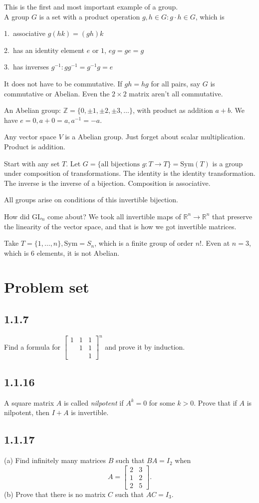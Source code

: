\documentclass[12pt]{article}
\newcommand{\RR}{\mathbb{R}}
\newcommand{\GL}{\text{GL}}
\newcommand{\inv}[1]{#1^{-1}}
\theoremstyle{definition}
\begin{document}
This is the first and most important example of a group. \\

A group \(G\) is a set with a product operation \(g,h\in G: g\cdot h\in G\), which is

1.\ associative \(g(hk) = (gh)k\)

2.\ has an identity element \(e\) or \(1\), \(eg=ge=g\)

3.\ has inverses \(\inv{g}: g\inv{g}=\inv{g}g=e\)

It does not have to be commutative. If \(gh=hg\) for all pairs, say \(G\) is commutative or Abelian.
Even the \(2 \times 2\) matrix aren't all commutative.

An Abelian group: \(\mathbb{Z} = \{0, \pm1, \pm2, \pm3, \ldots \} \),
with product as addition \(a + b\). We have \(e = 0, a+0=a, \inv{a}=-a\).

Any vector space \(V\) is a Abelian group. Just forget about scalar multiplication. Product is addition.

Start with any set \(T\). Let \(G = \{\text{all bijections } g:T\rightarrow T\}=\text{Sym}(T)\)
is a group under composition of transformations. The identity is the identity transformation.
The inverse is the inverse of a bijection. Composition is associative.

All groups arise on conditions of this invertible bijection.

How did \(\GL_n\) come about? We took all invertible maps of \(\RR^n\rightarrow\RR^n\) that
preserve the linearity of the vector space, and that is how we got invertible matrices.

Take \(T=\{1,\ldots,n\},\text{Sym}=S_n\), which is a finite group of order \(n\)!.
Even at \(n=3\), which is 6 elements, it is not Abelian.

\section{Problem set}
\subsection{1.1.7}

Find a formula for \({\left[\begin{smallmatrix}
    1 & 1 & 1\\
      & 1 & 1\\
      &   & 1
\end{smallmatrix}\right]}^{n}\) and prove it by induction.
\subsection{1.1.16}
A square matrix \(A\) is called \emph{nilpotent} if \(A^k = 0\) for some \(k > 0\).
Prove that if \(A\) is nilpotent, then \(I + A\) is invertible.
\subsection{1.1.17}
(a) Find infinitely many matrices \(B\) such that \(BA = I_2\) when
\[A = \begin{bmatrix}
    2 & 3\\
    1 & 2\\
    2 & 5
\end{bmatrix}.\]
(b) Prove that there is no matrix \(C\) such that \(AC = I_3\).
\end{document}
